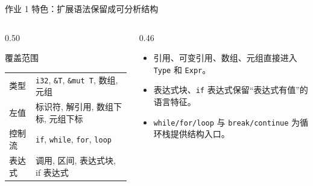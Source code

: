 \documentclass[aspectratio=169]{ctexbeamer}
\begin{document}
\begin{frame}{作业 1 特色：扩展语法保留成可分析结构}
    \begin{columns}[T]
    \begin{column}{0.50\textwidth}
        \begin{block}{覆盖范围}
            \scriptsize
            \begin{tabular}{p{1.2cm}p{4.2cm}}
                类型 & \texttt{i32}, \texttt{\&T}, \texttt{\&mut T}, 数组, 元组 \\
                左值 & 标识符, 解引用, 数组下标, 元组下标 \\
                控制流 & \texttt{if}, \texttt{while}, \texttt{for}, \texttt{loop} \\
                表达式 & 调用, 区间, 表达式块, if 表达式 \\
            \end{tabular}
        \end{block}
    \end{column}
    \begin{column}{0.46\textwidth}
        \begin{itemize}
            \item 引用、可变引用、数组、元组直接进入 \texttt{Type} 和 \texttt{Expr}。
            \item 表达式块、\texttt{if} 表达式保留“表达式有值”的语言特征。
            \item \texttt{while/for/loop} 与 \texttt{break/continue} 为循环栈提供结构入口。
        \end{itemize}
    \end{column}
    \end{columns}
\end{frame}
\end{document}

